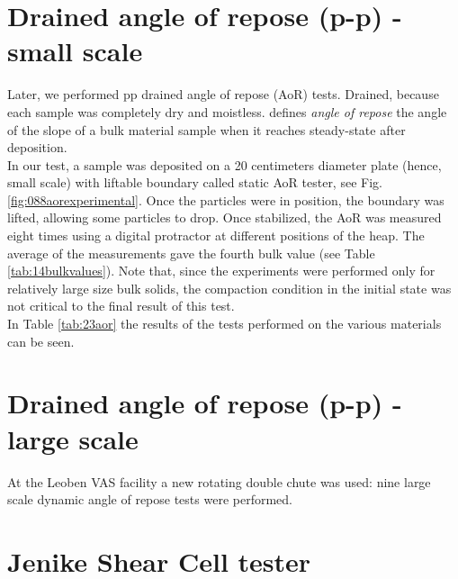 \section{Drained angle of repose (p-p) - small scale}
\label{sec:aor}

Later, we performed \acs{pp} drained angle of repose (\acs{AoR}) tests.
Drained, because each sample was completely dry and moistless.
\citet{RefWorks:69} defines \textit{angle of repose} the angle of the slope of a
bulk material sample when it reaches steady-state after deposition.\\
In our test, a sample was deposited on a 20 centimeters diameter plate (hence,
small scale) with liftable boundary called static \acs{AoR} tester, see Fig.
\ref{fig:088aorexperimental}.
Once the particles were in position, the boundary was lifted, allowing some
particles to drop.
Once stabilized, the \acs{AoR} was measured eight times using a digital
protractor at different positions of the heap.
The average of the measurements gave the fourth bulk value (see Table
\ref{tab:14bulkvalues}).
Note that, since the experiments were performed only for relatively large size
bulk solids, the compaction condition in the initial state was not critical to the
final result of this test.\\
In Table \ref{tab:23aor} the results of the tests performed on the various
materials can be seen.



\section{Drained angle of repose (p-p) - large scale}
\label{sec:aorlargescale}

At the Leoben VAS facility a new rotating double chute was used: 
nine large scale dynamic angle of repose tests were performed. 

\section{Jenike Shear Cell tester}
\label{sec:jsct}

